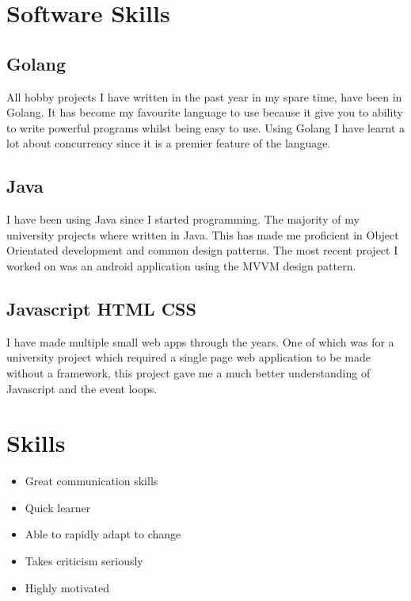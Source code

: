 \documentclass[a4paper]{cv}
\begin{document}
\begin{minipage}[t]{0.26\textwidth}

\section{Software Skills}
\subsection{Golang}
\begin{flushleft}
All hobby projects I have written in the past year in my spare time, have been in Golang. It has become my favourite language to use because it give you to ability to write powerful programs whilst being easy to use. Using Golang I have learnt a lot about concurrency since it is a premier feature of the language.
\end{flushleft}
\sectionspace

\subsection{Java}
\begin{flushleft}
I have been using Java since I started programming. The majority of my university projects where written in Java. This has made me proficient in Object Orientated development and common design patterns. The most recent project I worked on was an android application using the MVVM design pattern.
\end{flushleft}

\sectionspace
\subsection{Javascript \textbullet{} HTML \textbullet{} CSS}
\begin{flushleft}
I have made multiple small web apps through the years. One of which was for a university project which required a single page web application to be made without a framework, this project gave me a much better understanding of Javascript and the event loops.
\end{flushleft}
\section{Skills}
\begin{flushleft}
\begin{itemize}
    \item Great communication skills
    \item Quick learner
    \item Able to rapidly adapt to change
    \item Takes criticism seriously
    \item Highly motivated
\end{itemize}
\end{flushleft}
\end{minipage}
\end{document}
